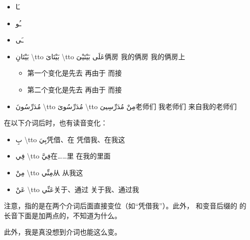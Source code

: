 \begin{Arabic}
    \begin{itemize}
        \item ـَا
        \item ـُو
        \item ـَى
    \end{itemize}
\end{Arabic}

\begin{itemize}
    \item \ac{بَيْتَانِ \tto بَيْتَاىَ \tto عَلَى بَيْتَيْىَ}{俩房 \tto 我的俩房 \tto 我的俩房上}
    \begin{itemize}
        \item 第一个变化是先去  再由于  而接 
        \item 第二个变化是先去  再由于  而接 
    \end{itemize}
    \item \ac{مُدَرِّسُونَ \tto مُدَرِّسُوىَ \tto مِنْ مُدَرِّسِيىَ}{老师们 \tto 我老师们  \tto 来自我的老师们 \\}
\end{itemize}


在以下介词后时，也有读音变化：

\begin{itemize}
    \item \ac{بِ \tto بِيَ}{凭借、在 \tto 凭借我、在我这}
    \item \ac{فِي \tto فِيَّ}{在……里 \tto 在我的里面}
    \item \ac{مِنْ \tto مِنِّي}{从 \tto 从我这}
    \item \ac{عَنْ \tto عَنِّي}{关于、通过 \tto 关于我、通过我}
\end{itemize}

\begin{note}
    注意，指的是在两个介词后面直接变位（如``凭借我''）。此外， 和变音后缀的  的长音下面是加两点的，不知道为什么。

    此外，我是真没想到介词也能这么变。
\end{note}